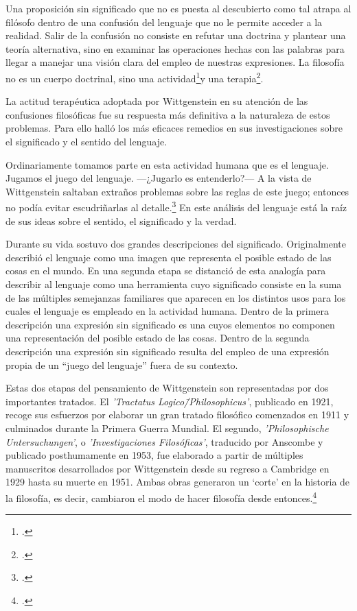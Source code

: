 Una proposición sin significado que no es puesta al descubierto como tal atrapa
al filósofo dentro de una confusión del lenguaje que no le permite acceder a la
realidad. Salir de la confusión no consiste en refutar una doctrina y plantear
una teoría alternativa, sino en examinar las operaciones hechas con las palabras
para llegar a manejar una visión clara del empleo de nuestras expresiones. La
filosofía no es un cuerpo doctrinal, sino una
actividad\footcite[cf.~][4.112]{tractatus}y una
terapia\footcite[cf.~][\S133]{PI}.

La actitud terapéutica adoptada por Wittgenstein en su atención de las
confusiones filosóficas fue su respuesta más definitiva a la naturaleza de estos
problemas. Para ello halló los más eficaces remedios en sus investigaciones
sobre el significado y el sentido del lenguaje.

Ordinariamente tomamos parte en esta actividad humana que es el lenguaje.
Jugamos el juego del lenguaje. ---¿Jugarlo es entenderlo?--- A la vista de
Wittgenstein saltaban extraños problemas sobre las reglas de este juego;
entonces no podía evitar escudriñarlas al
detalle.\footcite[cf.~][loc.7099]{monk} En este análisis del lenguaje está la
raíz de sus ideas sobre el sentido, el significado y la verdad.

Durante su vida sostuvo dos grandes descripciones del significado. Originalmente
describió el lenguaje como una imagen que representa el posible estado de las
cosas en el mundo. En una segunda etapa se distanció de esta analogía para
describir al lenguaje como una herramienta cuyo significado consiste en la suma
de las múltiples semejanzas familiares que aparecen en los distintos usos para
los cuales el lenguaje es empleado en la actividad humana. Dentro de la primera
descripción una expresión sin significado es una cuyos elementos no componen una
representación del posible estado de las cosas. Dentro de la segunda descripción
una expresión sin significado resulta del empleo de una expresión propia de un
``juego del lenguaje'' fuera de su contexto.


Estas dos etapas del pensamiento de Wittgenstein son representadas por dos
importantes tratados. El \emph{'Tractatus Logico\=/Philosophicus'}, publicado en
1921, recoge sus esfuerzos por elaborar un gran tratado filosófico comenzados en
1911 y culminados durante la Primera Guerra Mundial. El segundo,
\emph{'Philosophische Untersuchungen'}, o \emph{'Investigaciones Filosóficas'},
traducido por Anscombe y publicado posthumamente en 1953, fue elaborado a partir
de múltiples manuscritos desarrollados por Wittgenstein desde su regreso a
Cambridge en 1929 hasta su muerte en 1951. Ambas obras generaron un `corte' en
la historia de la filosofía, es decir, cambiaron el modo de hacer filosofía
desde entonces.\footcite[cf.~][p.~181]{twocuts}


